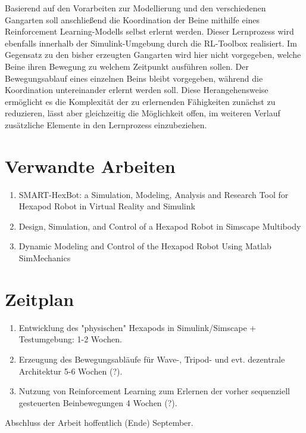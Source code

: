 Basierend auf den Vorarbeiten zur Modellierung und den verschiedenen Gangarten soll anschließend die Koordination der Beine mithilfe eines Reinforcement Learning-Modells selbst erlernt werden.
Dieser Lernprozess wird ebenfalls innerhalb der Simulink-Umgebung durch die RL-Toolbox realisiert.
Im Gegensatz zu den bisher erzeugten Gangarten wird hier nicht vorgegeben, welche Beine ihren Bewegung zu welchem Zeitpunkt ausführen sollen.
Der Bewegungsablauf eines einzelnen Beins bleibt vorgegeben, während die Koordination untereinander erlernt werden soll. 
Diese Herangehensweise ermöglicht es die Komplexität der zu erlernenden Fähigkeiten zunächst zu reduzieren, lässt aber gleichzeitig die Möglichkeit offen, im weiteren Verlauf zusätzliche Elemente in den Lernprozess einzubeziehen.


\section{Verwandte Arbeiten}
\begin{enumerate}

	

\item SMART-HexBot: a Simulation, Modeling, Analysis and
Research Tool for Hexapod Robot in Virtual Reality and
Simulink

\item Design, Simulation, and Control of a Hexapod Robot in
Simscape Multibody

\item Dynamic Modeling and Control of the Hexapod Robot Using Matlab SimMechanics

\end{enumerate}


\section{Zeitplan}
\begin{enumerate}
	\item Entwicklung des "physischen" Hexapods in Simulink/Simscape + Testumgebung: 1-2 Wochen.
	\item Erzeugung des Bewegungsabläufe für Wave-, Tripod- und evt. dezentrale Architektur 5-6 Wochen (?).
	\item Nutzung von Reinforcement Learning zum Erlernen der vorher sequenziell gesteuerten Beinbewegungen 4 Wochen (?).
\end{enumerate}


Abschluss der Arbeit hoffentlich (Ende) September.